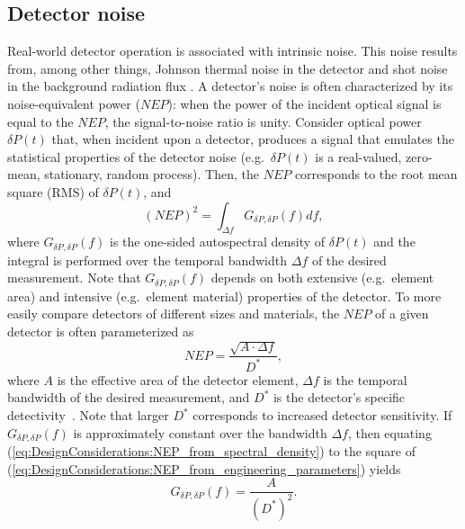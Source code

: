 \subsection{Detector noise}
Real-world detector operation is associated with intrinsic noise.
This noise results from, among other things,
Johnson thermal noise in the detector and
shot noise in the background radiation flux
\cite{hamamatsu_ir_detectors}.
A detector's noise is often characterized by
its noise-equivalent power ($NEP$):
when the power of the incident optical signal is equal to the $NEP$,
the signal-to-noise ratio is unity.
Consider optical power $\delta P(t)$ that, when incident upon a detector,
produces a signal that
emulates the statistical properties of the detector noise
(e.g.\ $\delta P(t)$ is a real-valued, zero-mean, stationary, random process).
Then, the $NEP$ corresponds to the root mean square (RMS) of $\delta P(t)$,
and
\begin{equation}
  (NEP)^2
  =
  \int_{\Delta f}
  G_{\delta P, \delta P}(f) df,
  \label{eq:DesignConsiderations:NEP_from_spectral_density}
\end{equation}
where $G_{\delta P, \delta P}(f)$ is
the one-sided autospectral density of $\delta P(t)$ and
the integral is performed over the temporal bandwidth $\Delta f$
of the desired measurement.
Note that $G_{\delta P, \delta P}(f)$ depends on both
extensive (e.g.\ element area) and intensive (e.g.\ element material)
properties of the detector.
To more easily compare detectors of different sizes and materials,
the $NEP$ of a given detector is often parameterized as
\begin{equation}
  NEP = \frac{\sqrt{A \cdot \Delta f}}{D^{*}},
  \label{eq:DesignConsiderations:NEP_from_engineering_parameters}
\end{equation}
where $A$ is the effective area of the detector element,
$\Delta f$ is the temporal bandwidth of the desired measurement, and
$D^{*}$ is the detector's specific detectivity~\cite{jones_josa60}.
Note that larger $D^{*}$ corresponds to increased detector sensitivity.
If $G_{\delta P, \delta P}(f)$ is approximately constant
over the bandwidth $\Delta f$, then equating
(\ref{eq:DesignConsiderations:NEP_from_spectral_density})
to the square of
(\ref{eq:DesignConsiderations:NEP_from_engineering_parameters})
yields
\begin{equation}
  G_{\delta P, \delta P}(f)
  =
  \frac{A}{(D^*)^2}.
  \label{eq:DesignConsiderations:NEP_spectral_density}
\end{equation}

